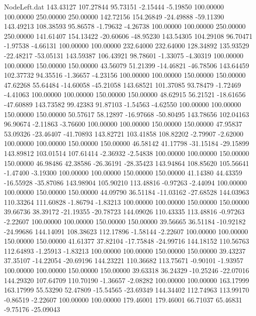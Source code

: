 \begin{filecontents}{NodeLeft.dat}
 143.43127  107.27844   95.73151    -2.15444   -5.19850  100.00000  100.00000  250.00000  250.00000  142.72156  154.26849  -24.49888  -59.11390
 143.49213  108.38593   95.86578    -1.79632   -4.26738  100.00000  100.00000  250.00000  250.00000  141.61407  154.13422  -20.60606  -48.95230
 143.54305  104.29108   96.70471    -1.97538   -4.66131  100.00000  100.00000  232.64000  232.64000  128.34892  135.93529  -22.48217  -53.05131
 143.59387  106.43921   98.78601    -1.33075   -4.30319  100.00000  100.00000  150.00000  150.00000   43.56079   51.21399  -14.46821  -46.78506
 143.64459  102.37732   94.35516    -1.36657   -4.23156  100.00000  100.00000  150.00000  150.00000   47.62268   55.64484  -14.60058  -45.21058
 143.68521  101.37085   93.78479    -1.72469   -4.41063  100.00000  100.00000  150.00000  150.00000   48.62915   56.21521  -18.61656  -47.60889
 143.73582   99.42383   91.87103    -1.54563   -4.62550  100.00000  100.00000  150.00000  150.00000   50.57617   58.12897  -16.97668  -50.80495
 143.78656  102.04163   96.90674    -2.11863   -3.76600  100.00000  100.00000  150.00000  150.00000   47.95837   53.09326  -23.46407  -41.70893
 143.82721  103.41858  108.82202    -2.79907   -2.62000  100.00000  100.00000  150.00000  150.00000   46.58142   41.17798  -31.15184  -29.15899
 143.89812  103.01514  107.61414    -2.36932   -2.54838  100.00000  100.00000  150.00000  150.00000   46.98486   42.38586  -26.36191  -28.35423
 143.94864  108.85620  105.56641    -1.47400   -3.19300  100.00000  100.00000  150.00000  150.00000   41.14380   44.43359  -16.55928  -35.87086
 143.98904  105.90210  113.48816    -0.97263   -2.44094  100.00000  100.00000  150.00000  150.00000   44.09790   36.51184  -11.03162  -27.68528
 144.03963  110.33264  111.60828    -1.86794   -1.83213  100.00000  100.00000  150.00000  150.00000   39.66736   38.39172  -21.19355  -20.78723
 144.09026  110.43335  113.48816    -0.97263   -2.22607  100.00000  100.00000  150.00000  150.00000   39.56665   36.51184  -10.92182  -24.99686
 144.14091  108.38623  112.17896    -1.58144   -2.22607  100.00000  100.00000  150.00000  150.00000   41.61377   37.82104  -17.75848  -24.99716
 144.18152  110.56763  112.64893    -1.25913   -1.83213  100.00000  100.00000  150.00000  150.00000   39.43237   37.35107  -14.22054  -20.69196
 144.23221  110.36682  113.75671    -0.90101   -1.93957  100.00000  100.00000  150.00000  150.00000   39.63318   36.24329  -10.25246  -22.07016
 144.29320  107.64709  110.70190    -1.36657   -2.08282  100.00000  100.00000  163.17999  163.17999   55.53290   52.47809  -15.54565  -23.69349
 144.34402  112.74963  113.99170    -0.86519   -2.22607  100.00000  100.00000  179.46001  179.46001   66.71037   65.46831   -9.75176  -25.09043

\end{filecontents}
